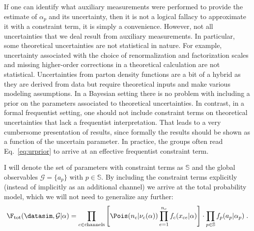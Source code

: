 If one can identify what auxiliary measurements were performed to provide the estimate of $\alpha_p$ and its uncertainty, then it is not a logical fallacy to approximate it with a constraint term, it is simply  a convenience.  However, not all uncertainties that we deal result from auxiliary measurements.  In particular, some theoretical uncertainties are not statistical in nature.  For example, uncertainty associated with the choice of renormalization and factorization scales and missing higher-order corrections in a theoretical calculation are not statistical.  Uncertainties from parton density functions are a bit of a hybrid as they are derived from data but require theoretical inputs and make various modeling assumptions.  In a Bayesian setting there is no problem with including a prior on the parameters associated to theoretical uncertainties.  In contrast, in a formal frequentist setting, one should not include constraint terms on theoretical uncertainties that lack a frequentist interpretation.  That leads to a very cumbersome presentation of results, since formally the results should be shown as a function of the uncertain parameter.  In practice, the groups often read Eq.~\ref{eq:urprior} to arrive at an effective frequentist constraint term.


I will denote the set of parameters with constraint terms as $\mathbb{S}$ and the global observables $\mathcal{G}=\{a_p\}$ with $p\in\mathbb{S}$.  By including the constraint terms explicitly (instead of implicitly as an additional channel) we arrive at the total probability model, which we will not need to generalize any further:
\begin{equation}
\label{Eq:ftot}
\F_{\textrm{tot}}(\datasim, \mathcal{G}|\alpha) = \prod_{c\in\rm channels} \left[ \Pois(n_c|\nu_c(\alpha)) \prod_{e=1}^{n_c} f_c(x_{ce}|\alpha) \right] \cdot \prod_{p \in \mathbb{S}} f_p(a_p | \alpha_p)\; .
\end{equation}
